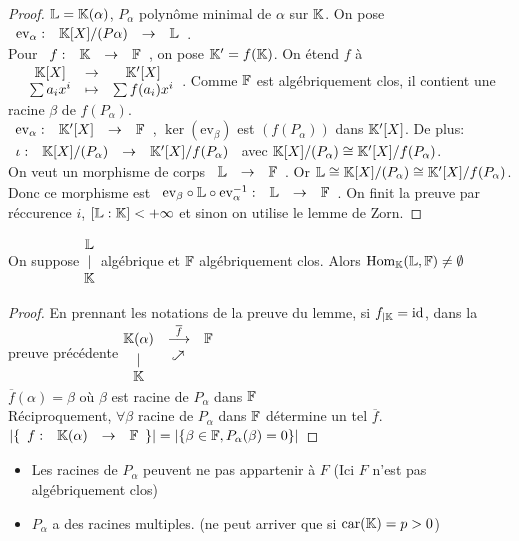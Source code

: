 \documentclass[]{report}
\begin{document}
    \begin{proof}
        $\mathbb{L}=\mathbb{K}(\alpha)$, $P_\alpha$ polynôme minimal de $\alpha$ sur $\mathbb{K}$. On pose $\begin{array}{ccccc} \text{ev}_\alpha : & \mathbb{K}[X]/(P\alpha) & \to & \mathbb{L} \end{array}$.\\ 
        Pour $\begin{array}{ccccc} f : & \mathbb{K} & \to & \mathbb{F} \end{array}$, on pose $\mathbb{K}'=f(\mathbb{K})$. On étend $f$ à $\begin{array}{ccccc} & \mathbb{K}[X] & \to & \mathbb{K}'[X] \\ & \sum a_i x^i & \mapsto & \sum f(a_i)x^i \end{array}$. Comme $\mathbb{F}$ est algébriquement clos, il contient une racine $\beta$ de $f(P_\alpha)$.\\
        $\begin{array}{ccccc} \text{ev}_{\alpha} : & \mathbb{K}'[X] & \to & \mathbb{F} \end{array}$, $\ker(\text{ev}_\beta)$ est $(f(P_\alpha))$ dans $\mathbb{K}'[X]$. De plus: $\begin{array}{ccccc} \iota : & \mathbb{K}[X]/(P_\alpha) & \to & \mathbb{K}'[X]/f(P_\alpha) \end{array}$ avec $\mathbb{K}[X]/(P_\alpha)\cong \mathbb{K}'[X]/f(P_\alpha)$.\\
        On veut un morphisme de corps $\begin{array}{ccccc} \mathbb{L} & \to & \mathbb{F} \end{array}$. Or $\mathbb{L}\cong\mathbb{K}[X]/(P_\alpha)\cong \mathbb{K}'[X]/f(P_\alpha)$. Donc ce morphisme est $\begin{array}{ccccc} \text{ev}_\beta\circ\mathbb{L}\circ\text{ev}_{\alpha}^{-1} : & \mathbb{L} & \to & \mathbb{F} \end{array}$. On finit la preuve par réccurence $i$, $[\mathbb{L}:\mathbb{K}]<+\infty$ et sinon on utilise le lemme de Zorn.
    \end{proof}

    \begin{tm}{}{}
    On suppose $\begin{matrix}
        \mathbb{L}\\
        |\\
        \mathbb{K}
    \end{matrix}$ algébrique et $\mathbb{F}$ algébriquement clos. Alors $\text{Hom}_{\mathbb{K}}(\mathbb{L},\mathbb{F})\neq \emptyset$
    \end{tm}

    \begin{proof}
        En prennant les notations de la preuve du lemme, si $f_{|\mathbb{K}}=\text{id}$, dans la preuve précédente $\begin{matrix}
            \K(\alpha)&\overset{\overline{f}}{\longrightarrow}&\Fa\\
            |&\text{\rotatebox{45}{$\hookrightarrow$}}& \\
            \K&&
        \end{matrix}$\\
        $\overline{f}(\alpha)=\beta$ où $\beta$ est racine de $P_\alpha$ dans $\mathbb{F}$\\
        Réciproquement, $\forall \beta$ racine de $P_\alpha$ dans $\mathbb{F}$ détermine un tel $\overline{f}$. $|\{\begin{array}{ccccc} f : & \mathbb{K}(\alpha) & \to & \mathbb{F} \end{array}\}|=|\{\beta\in \mathbb{F},P_\alpha(\beta)=0\}|$
    \end{proof}

    \begin{re}{}{}
        \begin{itemize}
            \item Les racines de $P_\alpha$ peuvent ne pas appartenir à $F$ (Ici $F$ n'est pas algébriquement clos)
            \item $P_\alpha$ a des racines multiples. (ne peut arriver que si $ \text{car}(\mathbb{K})=p>0$)
        \end{itemize}
    \end{re}
\end{document}
